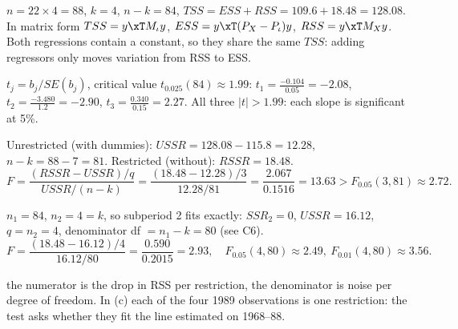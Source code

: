 \begin{solbox}
 $n = 22\times4 = 88$, $k = 4$, $n-k = 84$, $TSS = ESS + RSS = 109.6 + 18.48 = 128.08$.
In matrix form $TSS = y\xT M_{\iota}y$, $ESS = y\xT(P_{X}-P_{\iota})y$, $RSS = y\xT M_{X}y$.
Both regressions contain a constant, so they share the same $TSS$: adding regressors only moves
variation from RSS to ESS.

 $t_{j} = b_{j}/SE(b_{j})$, critical value $t_{0.025}(84)\approx1.99$:
$t_{1} = \frac{-0.104}{0.05} = -2.08$, $t_{2} = \frac{-3.480}{1.2} = -2.90$, $t_{3} = \frac{0.340}{0.15} = 2.27$.
All three $|t|>1.99$: each slope is significant at 5\%.

Unrestricted (with dummies): $USSR = 128.08 - 115.8 = 12.28$, $n-k = 88-7 = 81$.
Restricted (without): $RSSR = 18.48$.
\[
  F = \frac{(RSSR-USSR)/q}{USSR/(n-k)} = \frac{(18.48-12.28)/3}{12.28/81} = \frac{2.067}{0.1516} = 13.63
  > F_{0.05}(3,81)\approx2.72 .
\]

 $n_{1} = 84$, $n_{2} = 4 = k$, so subperiod 2 fits exactly: $SSR_{2} = 0$,
$USSR = 16.12$, $q = n_{2} = 4$, denominator df $= n_{1}-k = 80$ (see C6).
\[
  F = \frac{(18.48-16.12)/4}{16.12/80} = \frac{0.590}{0.2015} = 2.93,
  \quad F_{0.05}(4,80)\approx2.49,\ F_{0.01}(4,80)\approx3.56 .
\]
\begin{why}\Why the numerator is the drop in RSS per restriction, the denominator is noise
per degree of freedom. In (c) each of the four 1989 observations is one restriction: the test asks
whether they fit the line estimated on 1968--88.\end{why}
\end{solbox}

